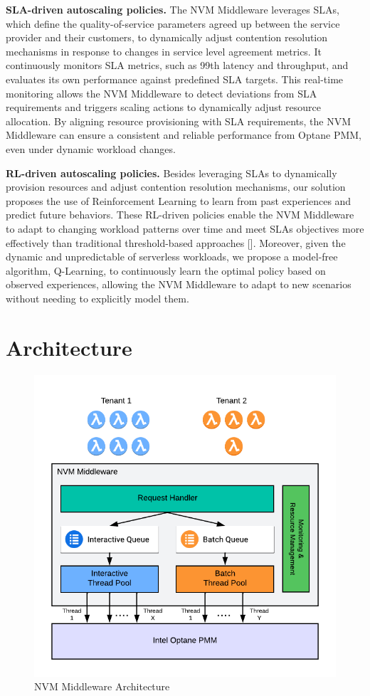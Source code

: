 \textbf{SLA-driven autoscaling policies.} The NVM Middleware leverages SLAs, which define the quality-of-service parameters agreed up between the service provider and their customers, to dynamically adjust contention resolution mechanisms in response to changes in service level agreement metrics. It continuously monitors SLA metrics, such as 99th latency and throughput, and evaluates its own performance against predefined SLA targets. This real-time monitoring allows the NVM Middleware to detect deviations from SLA requirements and triggers scaling actions to dynamically adjust resource allocation. By aligning resource provisioning with SLA requirements, the NVM Middleware can ensure a consistent and reliable performance from Optane PMM, even under dynamic workload changes.

\textbf{RL-driven autoscaling policies.} Besides leveraging SLAs to dynamically provision resources and adjust contention resolution mechanisms, our solution proposes the use of Reinforcement Learning to learn from past experiences and predict future behaviors.  These RL-driven policies enable the NVM Middleware to adapt to changing workload patterns over time and meet SLAs objectives more effectively than traditional threshold-based approaches []. Moreover, given the dynamic and unpredictable of serverless workloads, we propose a model-free algorithm, Q-Learning, to continuously learn the optimal policy based on observed experiences, allowing the NVM Middleware to adapt to new scenarios without needing to explicitly model them.

\section{Architecture}

\begin{figure}[ht]
  \centering
  \includegraphics[scale=1]{images/nvm_design.png}
  \caption[NVM Middleware Architecture]{NVM Middleware Architecture}
  \label{fig:nvm_architecture}
\end{figure}

